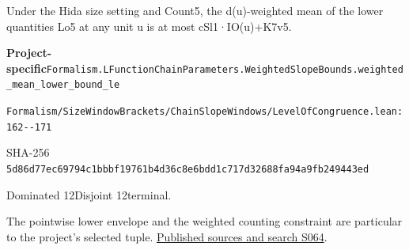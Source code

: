 
\begin{formalstatement}[D570]\label{decomp:D570}
Under the Hida size setting and Count5, the d(u)-weighted mean of the lower quantities Lo5 at any unit u is at most cSl1·IO(u)+K7v5.
\end{formalstatement}
{\small\raggedright\noindent\textsf{\bfseries Project-specific}\quad \nolinkurl{Formalism.LFunctionChainParameters.WeightedSlopeBounds.weighted_mean_lower_bound_le}\par\noindent \nolinkurl{Formalism/SizeWindowBrackets/ChainSlopeWindows/LevelOfCongruence.lean:162--171}\par\noindent SHA-256 \nolinkurl{5d86d77ec69794c1bbbf19761b4d36c8e6bdd1c717d32688fa94a9fb249443ed}\par\noindent Dominated 12\quad Disjoint 12\quad terminal.\par}
The pointwise lower envelope and the weighted counting constraint are particular to the project’s selected tuple.
\hyperref[lit:S064]{Published sources and search S064}.
